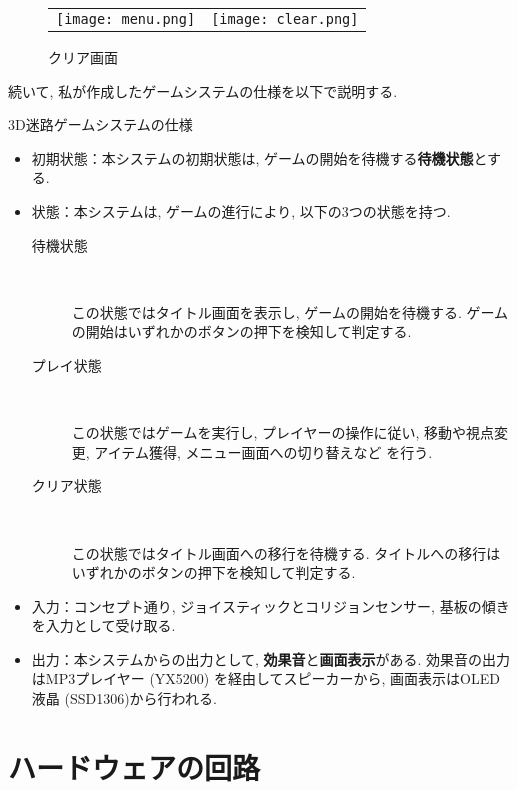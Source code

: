 \documentclass[10pt]{jsarticle}
\begin{document}
\begin{figure}[h]
	\begin{tabular}{cc}
	\begin{minipage}[t]{0.49\textwidth}
		\centering
		\texttt{[image: menu.png]}
		\caption{メニュー画面}
 		\label{menu}
	\end{minipage} &
	\begin{minipage}[t]{0.49\textwidth}
		\centering
		\texttt{[image: clear.png]}
		\caption{クリア画面}
	 	\label{clear}
	\end{minipage}
	\end{tabular}
\end{figure}

続いて, 私が作成したゲームシステムの仕様を以下で説明する.

\begin{itembox}[l]{3D迷路ゲームシステムの仕様}
\begin{itemize}
	\item	初期状態：本システムの初期状態は, ゲームの開始を待機する\textbf{待機状態}とする.
	\item	状態：本システムは, ゲームの進行により, 以下の3つの状態を持つ.
			\begin{description}
			\item[待機状態]	　\par
			この状態ではタイトル画面を表示し, ゲームの開始を待機する.
			ゲームの開始はいずれかのボタンの押下を検知して判定する.
			\item[プレイ状態]　\par
			この状態ではゲームを実行し, プレイヤーの操作に従い, 移動や視点変更, アイテム獲得, メニュー画面への切り替えなど
			を行う.
			\item[クリア状態]　\par
			この状態ではタイトル画面への移行を待機する.
			タイトルへの移行はいずれかのボタンの押下を検知して判定する.
			\end{description}
	\item	入力：コンセプト通り, ジョイスティックとコリジョンセンサー, 基板の傾きを入力として受け取る.
	\item	出力：本システムからの出力として, \textbf{効果音}と\textbf{画面表示}がある.
			効果音の出力はMP3プレイヤー (YX5200) を経由してスピーカーから, 画面表示はOLED液晶 (SSD1306)から行われる.
\end{itemize}
\end{itembox}

\section{ハードウェアの回路}
\end{document}
